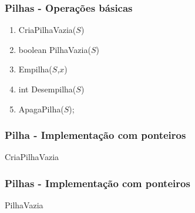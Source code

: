 \documentclass[aspectratio=169]{beamer}
\begin{document}
% 


\begin{frame}
\frametitle{Pilhas - Operações básicas}
\begin{enumerate}
 \item CriaPilhaVazia($S$) 
 \item boolean PilhaVazia($S$)
 \item Empilha($S$,$x$)
 \item int Desempilha($S$) 
 \item ApagaPilha($S$);
\end{enumerate}
\end{frame}


\begin{frame}
\frametitle{Pilha - Implementação com ponteiros}
\begin{algorithm}[H]
\caption{CriaPilhaVazia} 
\label{CriaPilhaVazia}
\end{algorithm}
\end{frame}


\begin{frame}
\frametitle{Pilhas - Implementação com ponteiros}
\begin{algorithm}[H]
\caption{PilhaVazia} 
\label{PilhaVazia}
\end{algorithm}
\end{frame}
\end{document}
